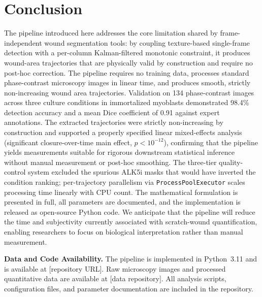 \section{Conclusion}

The pipeline introduced here addresses the core limitation shared by frame-independent
wound segmentation tools: by coupling texture-based single-frame detection with a
per-column Kalman-filtered monotonic constraint, it produces wound-area trajectories
that are physically valid by construction and require no post-hoc correction.
The pipeline requires no training data, processes standard phase-contrast microscopy images in
linear time, and produces smooth, strictly non-increasing wound area trajectories.
Validation on 134 phase-contrast images across three culture conditions in immortalized
myoblasts demonstrated 98.4\% detection accuracy and a mean Dice coefficient of 0.91 against
expert annotations.
The extracted trajectories were strictly non-increasing by construction and supported a
properly specified linear mixed-effects analysis (significant closure-over-time main effect,
$p < 10^{-12}$), confirming that the pipeline yields measurements suitable for rigorous
downstream statistical inference without manual measurement or post-hoc smoothing.
The three-tier quality-control system excluded the spurious ALK5i masks that would have
inverted the condition ranking; per-trajectory parallelism via \texttt{ProcessPoolExecutor}
scales processing time linearly with CPU count.
The mathematical formulation is presented in full, all parameters are documented, and the
implementation is released as open-source Python code.
We anticipate that the pipeline will reduce the time and subjectivity currently associated
with scratch-wound quantification, enabling researchers to focus on biological interpretation
rather than manual measurement.

\bigskip
\textbf{Data and Code Availability.}
The pipeline is implemented in Python~3.11 and is available at
[repository URL].
Raw microscopy images and processed quantitative data are available at [data repository].
All analysis scripts, configuration files, and parameter documentation are included in the
repository.
